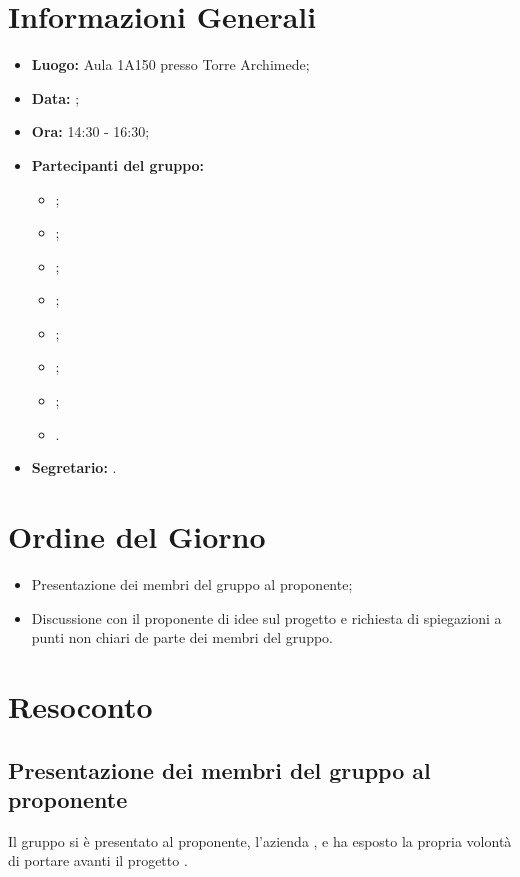 \section{Informazioni Generali}
\begin{itemize}
\item \textbf{Luogo:} Aula 1A150 presso Torre Archimede;
\item \textbf{Data:} \Data;
\item \textbf{Ora:} 14:30 - 16:30;
\item \textbf{Partecipanti del gruppo:}
	\begin{itemize}
	\item \AT{}; 
	\item \CE{}; 
	\item \DF{};
	\item \LD{};
	\item \PF{};
	\item \SE{};
	\item \BR{};
	\item \MC{}.
	\end{itemize} 
\item \textbf{Segretario:} \LD{}.
\end{itemize}


\section{Ordine del Giorno}
\begin{itemize}
	\item Presentazione dei membri del gruppo al proponente;
	\item Discussione con il proponente di idee sul progetto e richiesta di spiegazioni a punti non chiari de parte dei membri del gruppo.
\end{itemize}

\section{Resoconto}
\subsection{Presentazione dei membri del gruppo al proponente}
Il gruppo si è presentato al proponente, l'azienda \Proponente{}, e ha esposto la propria volontà di portare avanti il progetto \NomeProgetto.

